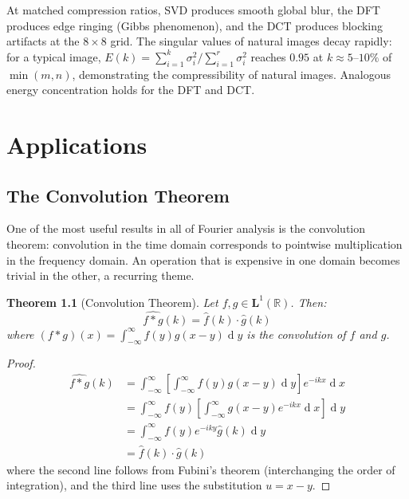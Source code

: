 \documentclass[12pt,a4paper]{report}
\DeclareMathOperator{\deriv}{d}
\theoremstyle{thms}
\newtheorem{theorem}{Theorem}[section]
\theoremstyle{defns}
\begin{document}
At matched compression ratios, SVD produces smooth global blur, the DFT produces edge ringing (Gibbs phenomenon), and the DCT produces blocking artifacts at the $8 \times 8$ grid. The singular values of natural images decay rapidly: for a typical image, $E(k) = \sum_{i=1}^{k}\sigma_i^2 / \sum_{i=1}^{r}\sigma_i^2$ reaches $0.95$ at $k \approx 5\text{--}10\%$ of $\min(m, n)$, demonstrating the compressibility of natural images. Analogous energy concentration holds for the DFT and DCT.


\chapter{Applications}
\label{ch:applications}

\section{The Convolution Theorem}
\label{sec:convolution}

One of the most useful results in all of Fourier analysis is the convolution theorem: convolution in the time domain corresponds to pointwise multiplication in the frequency domain. An operation that is expensive in one domain becomes trivial in the other, a recurring theme.

\begin{theorem}[Convolution Theorem]
    Let $f, g \in \mathbf{L}^1(\mathbb{R})$. Then:
    \begin{equation}
        \widehat{f * g}(k) = \hat{f}(k) \cdot \hat{g}(k)
    \end{equation}
    where $(f * g)(x) = \int_{-\infty}^{\infty} f(y)g(x - y)\deriv{y}$ is the convolution of $f$ and $g$.
    \label{thm:convolution}
\end{theorem}

\begin{proof}
    \begin{align}
        \widehat{f * g}(k) & = \int_{-\infty}^{\infty} \left[\int_{-\infty}^{\infty} f(y)g(x-y)\deriv{y}\right] e^{-ikx}\deriv{x}     \\
                           & = \int_{-\infty}^{\infty} f(y) \left[\int_{-\infty}^{\infty} g(x-y) e^{-ikx}\deriv{x}\right] \deriv{y}     \\
                           & = \int_{-\infty}^{\infty} f(y) e^{-iky} \hat{g}(k) \deriv{y}                                               \\
                           & = \hat{f}(k) \cdot \hat{g}(k)
    \end{align}
    where the second line follows from Fubini's theorem (interchanging the order of integration), and the third line uses the substitution $u = x - y$.
\end{proof}
\end{document}
